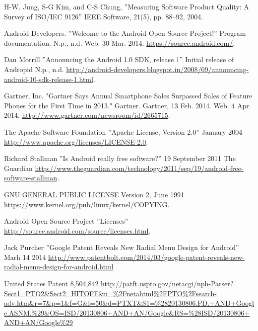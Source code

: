 \documentclass[conference]{IEEEtran}
\begin{document}
\begin{thebibliography}{1}

H-W. Jung, S-G Kim, and C-S Chung, ''Measuring Software Product Quality: A Survey of ISO/IEC 9126'' IEEE Software, 21(5), pp. 88--92, 2004.


Android Developers. ''Welcome to the Android Open Source Project!'' Program documentation. N.p., n.d. Web. 30 Mar. 2014. \url{https://source.android.com/}.

Dan Morrill ''Announcing the Android 1.0 SDK, release 1'' Initial release of Andropid N.p., n.d. \url{http://android-developers.blogspot.in/2008/09/announcing-android-10-sdk-release-1.html}.

Gartner, Inc. "Gartner Says Annual Smartphone Sales Surpassed Sales of Feature Phones for the First Time in 2013." Gartner. Gartner, 13 Feb. 2014. Web. 4 Apr. 2014. \url{http://www.gartner.com/newsroom/id/2665715}.

The Apache Software Foundation ''Apache License, Version 2.0'' January 2004 \url{http://www.apache.org/licenses/LICENSE-2.0}.

Richard Stallman ''Is Android really free software?'' 19 September 2011 The Guardian \url{http://www.theguardian.com/technology/2011/sep/19/android-free-software-stallman}.

GNU GENERAL PUBLIC LICENSE Version 2, June 1991 \url{https://www.kernel.org/pub/linux/kernel/COPYING}.

Android Open Source Project ''Licenses'' \url{http://source.android.com/source/licenses.html}.

Jack Purcher ''Google Patent Reveals New Radial Menu Design for Android'' Marh 14 2014 \url{http://www.patentbolt.com/2014/03/google-patent-reveals-new-radial-menu-design-for-android.html}

United States Patent 8,504,842 \url{http://patft.uspto.gov/netacgi/nph-Parser?Sect1=PTO2&Sect2=HITOFF&u=\%2Fnetahtml\%2FPTO\%2Fsearch-adv.htm&r=7&p=1&f=G&l=50&d=PTXT&S1=\%2820130806.PD.+AND+Google.ASNM.\%29&OS=ISD/20130806+AND+AN/Google&RS=\%28ISD/20130806+AND+AN/Google\%29}


\end{thebibliography}
\end{document}
